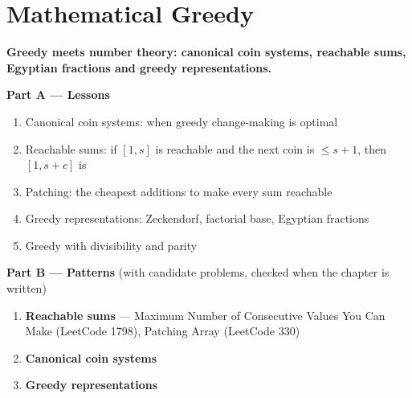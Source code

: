 \chapter{Mathematical Greedy}
\label{ch:math_greedy}

\begin{tcolorbox}[enhanced, colback=white, colframe=secondaryblue, boxrule=1pt, arc=2mm]
\textbf{\large\textcolor{primaryblue}{Greedy meets number theory: canonical coin systems, reachable sums, Egyptian fractions and greedy representations.}}
\end{tcolorbox}


\begin{plannedbox}
\textbf{Part A --- Lessons}
\begin{enumerate}[leftmargin=*, label=\textbf{A\arabic*.}, itemsep=1pt]
    \item Canonical coin systems: when greedy change-making is optimal
    \item Reachable sums: if $[1, s]$ is reachable and the next coin is $\le s+1$, then $[1, s+c]$ is
    \item Patching: the cheapest additions to make every sum reachable
    \item Greedy representations: Zeckendorf, factorial base, Egyptian fractions
    \item Greedy with divisibility and parity
\end{enumerate}
\textbf{Part B --- Patterns} (with candidate problems, checked when the chapter is written)
\begin{enumerate}[leftmargin=*, label=\textbf{P\arabic*.}, itemsep=1pt]
    \item \textbf{Reachable sums} --- Maximum Number of Consecutive Values You Can Make {\small\color{darkgray}(LeetCode 1798)}, Patching Array {\small\color{darkgray}(LeetCode 330)}
    \item \textbf{Canonical coin systems}
    \item \textbf{Greedy representations}
\end{enumerate}
\end{plannedbox}
